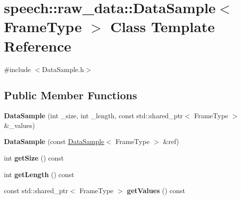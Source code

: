 \hypertarget{classspeech_1_1raw__data_1_1DataSample}{\section{speech\+:\+:raw\+\_\+data\+:\+:Data\+Sample$<$ Frame\+Type $>$ Class Template Reference}
\label{classspeech_1_1raw__data_1_1DataSample}
}


{\ttfamily \#include $<$Data\+Sample.\+h$>$}

\subsection*{Public Member Functions}
\begin{DoxyCompactItemize}
\item 
\hypertarget{classspeech_1_1raw__data_1_1DataSample_af3f41d2cbd910e6a23453f2f2f2c7cb4}{{\bfseries Data\+Sample} (int \+\_\+size, int \+\_\+length, const std\+::shared\+\_\+ptr$<$ Frame\+Type $>$ \&\+\_\+values)}\label{classspeech_1_1raw__data_1_1DataSample_af3f41d2cbd910e6a23453f2f2f2c7cb4}

\item 
\hypertarget{classspeech_1_1raw__data_1_1DataSample_aab1bd8e721126063be66e7b2e7b3f344}{{\bfseries Data\+Sample} (const \hyperlink{classspeech_1_1raw__data_1_1DataSample}{Data\+Sample}$<$ Frame\+Type $>$ \&ref)}\label{classspeech_1_1raw__data_1_1DataSample_aab1bd8e721126063be66e7b2e7b3f344}

\item 
\hypertarget{classspeech_1_1raw__data_1_1DataSample_a9c6946999fdcc14fccf9729a45e9dd50}{int {\bfseries get\+Size} () const }\label{classspeech_1_1raw__data_1_1DataSample_a9c6946999fdcc14fccf9729a45e9dd50}

\item 
\hypertarget{classspeech_1_1raw__data_1_1DataSample_a221ce8f47f67324f439b492cb81d75b1}{int {\bfseries get\+Length} () const }\label{classspeech_1_1raw__data_1_1DataSample_a221ce8f47f67324f439b492cb81d75b1}

\item 
\hypertarget{classspeech_1_1raw__data_1_1DataSample_a8d0b675c1399dca7a6dbbe9ab9431163}{const std\+::shared\+\_\+ptr$<$ Frame\+Type $>$ {\bfseries get\+Values} () const }\label{classspeech_1_1raw__data_1_1DataSample_a8d0b675c1399dca7a6dbbe9ab9431163}

\end{DoxyCompactItemize}
